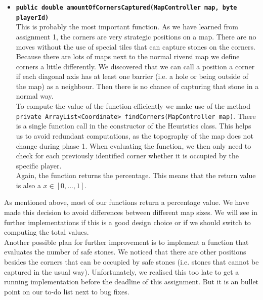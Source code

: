 \begin{itemize}
    \item \textbf{\texttt{public double amountOfCornersCaptured(MapController map, byte playerId)}}\\
    This is probably the most important function. As we have learned from assignment 1, the corners are very strategic positions on a map. There are no moves without the use of special tiles that can capture stones on the corners. Because there are lots of  maps next to the normal riversi map we define corners a little differently. We discovered that we can call a position a corner if each diagonal axis has at least one barrier (i.e. a hole or being outside of the map) as a neighbour. Then there is no chance of capturing that stone in a normal way.\\
    To compute the value of the function efficiently we make use of the method \texttt{private ArrayList<Coordinate> findCorners(MapController map)}. There is a single function call in the constructor of the Heuristics class. This helps us to avoid redundant computations, as the topography of the map does not change during phase 1. When evaluating the function, we then only need to check for each previously identified corner whether it is occupied by the specific player.\\
    Again, the function returns the percentage. This means that the return value is also a $x \in [0,...,1]$.
\end{itemize}

\noindent As mentioned above, most of our functions return a percentage value. We have made this decision to avoid differences between different map sizes. We will see in further implementations if this is a good design choice or if we should switch to computing the total values.\\
Another possible plan for further improvement is to implement a function that evaluates the number of safe stones. We noticed that there are other positions besides the corners that can be occupied by safe stones (i.e. stones that cannot be captured in the usual way). Unfortunately, we realised this too late to get a running implementation before the deadline of this assignment. But it is an bullet point on our to-do list next to bug fixes.
